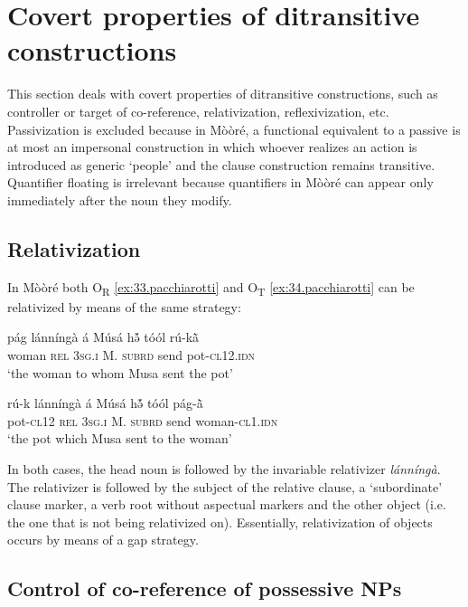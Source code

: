 \documentclass[output=paper]{langsci/langscibook}
\begin{document}
\section{Covert properties of ditransitive constructions}\label{§5:covert.pacchiarotti}

This section deals with covert properties of ditransitive constructions, such as controller or target of co-reference, relativization, reflexivization, etc. Passivization is excluded because in M\`{o}\`{o}r\'{e}, a functional equivalent to a passive is at most an impersonal construction in which whoever realizes an action is introduced as generic `people' and the clause construction remains transitive. Quantifier floating is irrelevant because quantifiers in M\`{o}\`{o}r\'{e} can appear only immediately after the noun they modify. 

\subsection{Relativization}\label{§5.1:relativization.pacchiarotti}

In M\`{o}\`{o}r\'{e} both O\textsubscript{R} \ref{ex:33.pacchiarotti} and O\textsubscript{T} \ref{ex:34.pacchiarotti} can be relativized by means of the same strategy:

\ea
\label{ex:33.pacchiarotti}
\gll p\'{a}g    l\'{a}nn\'{i}ng\`{a}  \'{a}    M\'{u}s\'{a}  hə̃́    t\'{o}\'{o}l  r\'{u}-k\`{\~{a}}\\
woman  \textsc{rel}    \textsc{3sg.i  }  M.  \textsc{subrd}    send  pot-\textsc{cl12.idn}\\
\glt `the woman to whom Musa sent the pot'
\z

\ea
\label{ex:34.pacchiarotti}
\gll r\'{u}-k    l\'{a}nn\'{i}ng\`{a}  \'{a}    M\'{u}s\'{a}  hə̃́    t\'{o}\'{o}l  p\'{a}g-\`{\~{a}}\\
pot-\textsc{cl12}  \textsc{rel}    \textsc{3sg.i  }  M.  \textsc{subrd}    send  woman-\textsc{cl1.idn}\\
\glt `the pot which Musa sent to the woman'
\z

In both cases, the head noun is followed by the invariable relativizer \textit{l\'{a}nn\'{i}ng\`{a}}. The relativizer is followed by the subject of the relative clause, a `subordinate' clause marker, a verb root without aspectual markers and the other object (i.e. the one that is not being relativized on). Essentially, relativization of objects occurs by means of a gap strategy. 

\subsection{Control of co-reference of possessive NPs}\label{§5.2:Control.pacchiarotti}
\end{document}
